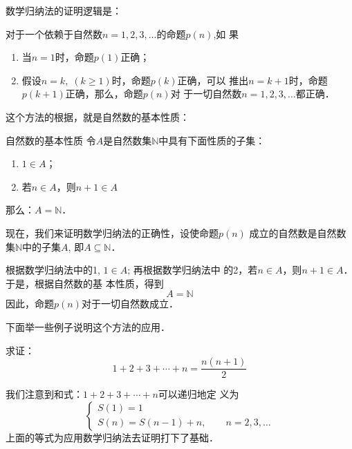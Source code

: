 数学归纳法的证明逻辑是：

对于一个依赖于自然数$n=1,2,3,\ldots$的命题$p(n)$,如
果
\begin{enumerate}
    \item 当$n=1$时，命题$p(1)$正确；
    \item 假设$n=k,\; (k\ge 1)$时，命题$p(k)$正确，可以
推出$n=k+1$时，命题$p(k+1)$正确，那么，命题$p(n)$对
于一切自然数$n=1,2,3,\ldots$都正确．
\end{enumerate}

这个方法的根据，就是自然数的基本性质：

\begin{blk}{自然数的基本性质}
    令$A$是自然数集$\mathbb{N}$中具有下面性质的子集：
\begin{enumerate}
    \item $1\in A$；
    \item 若$n\in A$，则$n+1\in A$
\end{enumerate}
那么：$A=\mathbb{N}$．
\end{blk}

现在，我们来证明数学归纳法的正确性，设使命题$p(n)$
成立的自然数是自然数集$\mathbb{N}$中的子集$A$, 即$A\subseteq \mathbb{N}$．

根据数学归纳法中的1, $1\in A$; 再根据数学归纳法中
的2，若$n\in A$，则$n+1\in A$．于是，根据自然数的基
本性质，得到
$$A=\mathbb{N}$$
因此，命题$p(n)$对于一切自然数成立．

下面举一些例子说明这个方法的应用．

\begin{example}
    求证：
    \begin{equation}
        1+2+3+\cdots+n=\frac{n(n+1)}{2}
    \end{equation}
\end{example}

\begin{analyze}
    我们注意到和式：$ 1+2+3+\cdots+n$可以递归地定
义为
\[\begin{cases}
    S(1)=1\\
    S(n)=S(n-1)+n,\qquad n=2,3,\ldots
\end{cases}\]
上面的等式为应用数学归纳法去证明打下了基础．
\end{analyze}

